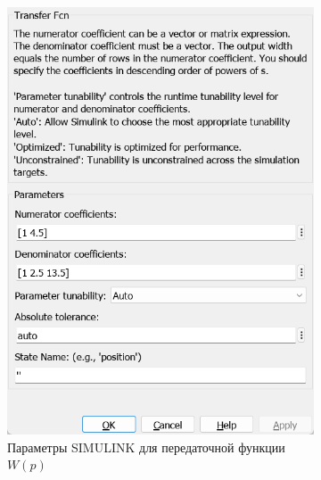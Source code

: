 \documentclass[a4paper, 12pt]{article}
\begin{document}
    \begin{figure}[H]
        \centering
        \begin{subfigure}{0.3\textwidth}
            \centering
            \includegraphics[width=\linewidth]{W_p_2_window.png}
            \caption{Параметры SIMULINK для передаточной функции $W(p)$}
            \label{fig:wp2w}
        \end{subfigure}
        \begin{subfigure}{0.3\textwidth}
            \centering

\end{subfigure}
\end{figure}
\end{document}
